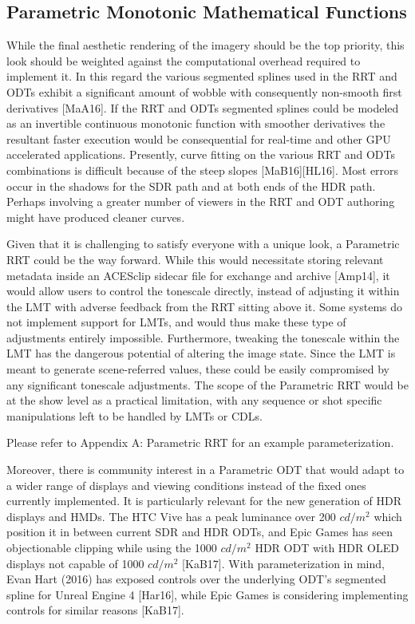 \documentclass[conference]{IEEEtran}
\begin{document}
\subsection{Parametric Monotonic Mathematical Functions}
While the final aesthetic rendering of the imagery should be the top priority, this look should be weighted against the computational overhead required to implement it. In this regard the various segmented splines used in the RRT and ODTs exhibit a significant amount of wobble with consequently non-smooth first derivatives [MaA16]. If the RRT and ODTs segmented splines could be modeled as an invertible continuous monotonic function with smoother derivatives the resultant faster execution would be consequential for real-time and other GPU accelerated applications. Presently, curve fitting on the various RRT and ODTs combinations is difficult because of the steep slopes [MaB16][HL16]. Most errors occur in the shadows for the SDR path and at both ends of the HDR path. Perhaps involving a greater number of viewers in the RRT and ODT authoring might have produced cleaner curves.

Given that it is challenging to satisfy everyone with a unique look, a Parametric RRT could be the way forward. While this would necessitate storing relevant metadata inside an ACESclip sidecar file for exchange and archive [Amp14], it would allow users to control the tonescale directly, instead of adjusting it within the LMT with adverse feedback from the RRT sitting above it. Some systems do not implement support for LMTs, and would thus make these type of adjustments entirely impossible. Furthermore, tweaking the tonescale within the LMT has the dangerous potential of altering the image state. Since the LMT is meant to generate scene-referred values, these could be easily compromised by any significant tonescale adjustments. The scope of the Parametric RRT would be at the show level as a practical limitation, with any sequence or shot specific manipulations left to be handled by LMTs or CDLs.

Please refer to Appendix A: Parametric RRT for an example parameterization.

Moreover, there is community interest in a Parametric ODT that would adapt to a wider range of displays and viewing conditions instead of the fixed ones currently implemented. It is particularly relevant for the new generation of HDR displays and HMDs. The HTC Vive has a peak luminance over 200 $cd/m^2$ which position it in between current SDR and HDR ODTs, and Epic Games has seen objectionable clipping while using the 1000 $cd/m^2$ HDR ODT with HDR OLED displays not capable of 1000 $cd/m^2$ [KaB17]. With parameterization in mind, Evan Hart (2016) has exposed controls over the underlying ODT's segmented spline for Unreal Engine 4 [Har16], while Epic Games is considering implementing controls for similar reasons [KaB17].
\end{document}
